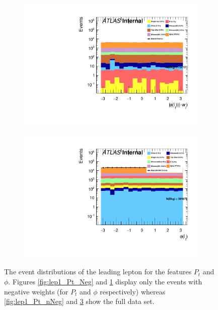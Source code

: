 \begin{figure}
{    \centering
    \begin{subfigure}{.425\textwidth}
        \includegraphics[width=\textwidth]{Figures/FeaturesHistograms/lep1_Phi_Neg.pdf}
        \vspace{-1.5cm}
        \caption{}
        \label{fig:lep1_Phi_Neg}
    \end{subfigure}
    \hfill
    \begin{subfigure}{.425\textwidth}
        \includegraphics[width=\textwidth]{Figures/FeaturesHistograms/lep1_Phi_nNeg.pdf}
        \vspace{-1.5cm}
        \caption{}
        \label{fig:lep1_Phi_nNeg}
    \end{subfigure}
    }
    \caption{The event distributions of the leading lepton for the features $P_t$ and $\phi$. 
    Figures \ref{fig:lep1_Pt_Neg} and \ref{fig:lep1_Phi_Neg} display only the events with 
    negative weights (for $P_t$ and $\phi$ respectively) whereas \ref{fig:lep1_Pt_nNeg} 
    and \ref{fig:lep1_Phi_nNeg} show the full data set.}
\end{figure}

